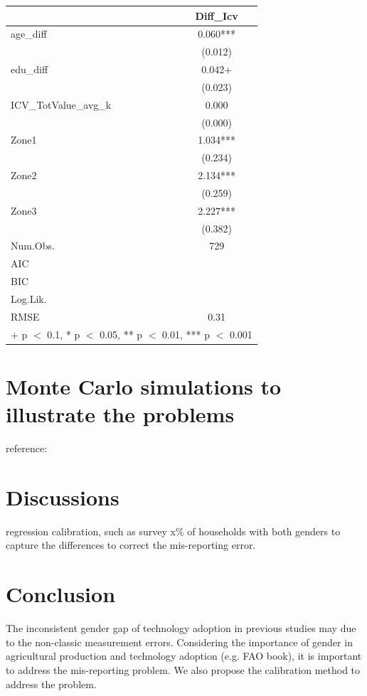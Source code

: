 \documentclass[12pt]{article}
\begin{document}
\begin{table}[hH]
	\centering
	\begin{tabular}[t]{lc}
		\toprule
		& Diff\_Icv\\
		\midrule
		age\_diff & 0.060***\\
		& (0.012)\\
		edu\_diff & 0.042+\\
		& (0.023)\\
		ICV\_TotValue\_avg\_k & 0.000\\
		& (0.000)\\
		Zone1 & 1.034***\\
		& (0.234)\\
		Zone2 & 2.134***\\
		& (0.259)\\
		Zone3 & 2.227***\\
		& (0.382)\\
		\midrule
		Num.Obs. & 729\\
		AIC & \\
		BIC & \\
		Log.Lik. & \\
		RMSE & 0.31\\
		\bottomrule
		\multicolumn{2}{l}{\rule{0pt}{1em}+ p $<$ 0.1, * p $<$ 0.05, ** p $<$ 0.01, *** p $<$ 0.001}\\
	\end{tabular}
\end{table}


\section{Monte Carlo simulations to illustrate the problems}
reference: \citet{chen2011nonlinear}

	\section{Discussions} \label{sec:discussion}
		regression calibration, such as %
		survey x\% of households with both genders to capture the differences to correct the mis-reporting error. 
	\section{Conclusion} \label{sec:conclusion}
	The inconsistent gender gap of technology adoption in previous studies may due to the non-classic measurement errors. Considering the importance of gender in agricultural production and technology adoption (e.g. FAO book), it is important to address the mis-reporting problem. We also propose the calibration method to address the problem. 
	
\end{document}
